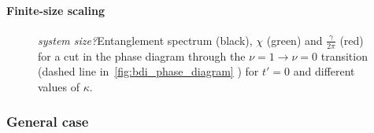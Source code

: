 \documentclass[twocolumn,amsmath,longbibliography,amssymb,superscriptaddress]{revtex4-1}
\newcommand{\mariac}[1]{{\it\color{cyan}#1}}
\begin{document}
\paragraph*{Finite-size scaling}

%
%
\begin{figure}[h!]
\centering
{}
\caption{\mariac{system size?}Entanglement spectrum (black), $\chi$ (green) and $\frac{\gamma}{2\pi}$ (red) for a cut in the phase diagram through the $\nu = 1 \rightarrow \nu = 0$ transition (dashed line in~\ref{fig:bdi_phase_diagram}
	) for $t'=0$ and different values of $\kappa$.}
\label{huang}
\end{figure}

\subsubsection{General case}
\end{document}

